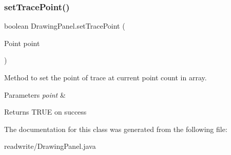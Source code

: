 \subsubsection{\texorpdfstring{set\+Trace\+Point()}{setTracePoint()}}
{\footnotesize\ttfamily boolean Drawing\+Panel.\+set\+Trace\+Point (\begin{DoxyParamCaption}\item[{Point}]{point }\end{DoxyParamCaption})}



Method to set the point of trace at current point count in array. 


\begin{DoxyParams}{Parameters}
{\em point} & \\
\hline
\end{DoxyParams}
\begin{DoxyReturn}{Returns}
T\+R\+UE on success 
\end{DoxyReturn}


The documentation for this class was generated from the following file\+:\begin{DoxyCompactItemize}
\item 
readwrite/Drawing\+Panel.\+java\end{DoxyCompactItemize}
